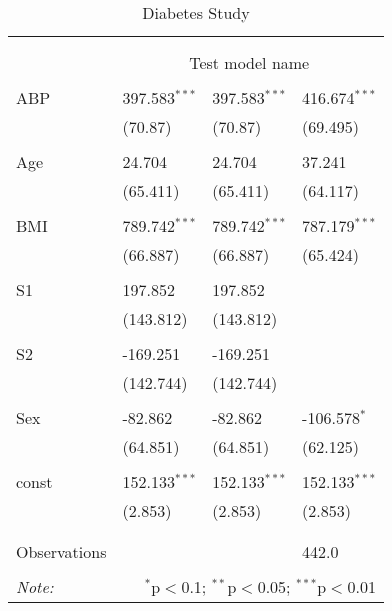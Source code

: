 \begin{table}[!htbp] \centering
  \caption{Diabetes Study}
  \label{}
\begin{tabularx}{\textwidth}{lXXX}
\\[-1.8ex]\hline
\hline \\[-1.8ex]
& \multicolumn{3}{c}{\textit{}} \
\cr \cline{3-4}
\\[-1.8ex] & \multicolumn{3}{c}{Test model name} \\\hline \\[-1.8ex]
 ABP & 397.583$^{***}$ & 397.583$^{***}$ & 416.674$^{***}$ \\
  & (70.87) & (70.87) & (69.495) \\
  & & & \\
 Age & 24.704$^{}$ & 24.704$^{}$ & 37.241$^{}$ \\
  & (65.411) & (65.411) & (64.117) \\
  & & & \\
 BMI & 789.742$^{***}$ & 789.742$^{***}$ & 787.179$^{***}$ \\
  & (66.887) & (66.887) & (65.424) \\
  & & & \\
 S1 & 197.852$^{}$ & 197.852$^{}$ & \\
  & (143.812) & (143.812) & \\
  & & & \\
 S2 & -169.251$^{}$ & -169.251$^{}$ & \\
  & (142.744) & (142.744) & \\
  & & & \\
 Sex & -82.862$^{}$ & -82.862$^{}$ & -106.578$^{*}$ \\
  & (64.851) & (64.851) & (62.125) \\
  & & & \\
 const & 152.133$^{***}$ & 152.133$^{***}$ & 152.133$^{***}$ \\
  & (2.853) & (2.853) & (2.853) \\
  & & & \\
\hline \\[-1.8ex]
 Observations &   &   & 442.0 \\
\hline
\hline \\[-1.8ex]
\textit{Note:} & \multicolumn{3}{r}{$^{*}$p$<$0.1; $^{**}$p$<$0.05; $^{***}$p$<$0.01} \\
\end{tabularx}
\end{table}